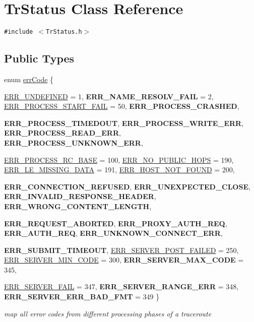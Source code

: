 \hypertarget{classTrStatus}{
\section{TrStatus Class Reference}
\label{classTrStatus}
}
{\tt \#include $<$TrStatus.h$>$}

\subsection*{Public Types}
\begin{CompactItemize}
\item 
enum \hyperlink{classTrStatus_366057e7e0cc467a592518e5f0da5302}{errCode} \{ \par
\hyperlink{classTrStatus_366057e7e0cc467a592518e5f0da5302c3415fb00f1515e6cfcc42d0774f5eb1}{ERR\_\-UNDEFINED} =  1, 
\textbf{ERR\_\-NAME\_\-RESOLV\_\-FAIL} =  2, 
\hyperlink{classTrStatus_366057e7e0cc467a592518e5f0da5302791e538219fe70804d43a86e51cf73c0}{ERR\_\-PROCESS\_\-START\_\-FAIL} =  50, 
\textbf{ERR\_\-PROCESS\_\-CRASHED}, 
\par
\textbf{ERR\_\-PROCESS\_\-TIMEDOUT}, 
\textbf{ERR\_\-PROCESS\_\-WRITE\_\-ERR}, 
\textbf{ERR\_\-PROCESS\_\-READ\_\-ERR}, 
\textbf{ERR\_\-PROCESS\_\-UNKNOWN\_\-ERR}, 
\par
\hyperlink{classTrStatus_366057e7e0cc467a592518e5f0da5302942bd0dd29fcfa7e4566a28bbf969393}{ERR\_\-PROCESS\_\-RC\_\-BASE} =  100, 
\hyperlink{classTrStatus_366057e7e0cc467a592518e5f0da5302257b1efa4186c926bd152bbee68c2c4f}{ERR\_\-NO\_\-PUBLIC\_\-HOPS} =  190, 
\hyperlink{classTrStatus_366057e7e0cc467a592518e5f0da53028c1c3321a69ca2c1b6dcf5be3b0e1a79}{ERR\_\-LE\_\-MISSING\_\-DATA} =  191, 
\hyperlink{classTrStatus_366057e7e0cc467a592518e5f0da53026be2333c602f24072eec6688160f5e32}{ERR\_\-HOST\_\-NOT\_\-FOUND} =  200, 
\par
\textbf{ERR\_\-CONNECTION\_\-REFUSED}, 
\textbf{ERR\_\-UNEXPECTED\_\-CLOSE}, 
\textbf{ERR\_\-INVALID\_\-RESPONSE\_\-HEADER}, 
\textbf{ERR\_\-WRONG\_\-CONTENT\_\-LENGTH}, 
\par
\textbf{ERR\_\-REQUEST\_\-ABORTED}, 
\textbf{ERR\_\-PROXY\_\-AUTH\_\-REQ}, 
\textbf{ERR\_\-AUTH\_\-REQ}, 
\textbf{ERR\_\-UNKNOWN\_\-CONNECT\_\-ERR}, 
\par
\textbf{ERR\_\-SUBMIT\_\-TIMEOUT}, 
\hyperlink{classTrStatus_366057e7e0cc467a592518e5f0da5302d82874b4be3ee405df340a92f763161e}{ERR\_\-SERVER\_\-POST\_\-FAILED} =  250, 
\hyperlink{classTrStatus_366057e7e0cc467a592518e5f0da5302d9e3f200861eaf809811bde85ee56520}{ERR\_\-SERVER\_\-MIN\_\-CODE} =  300, 
\textbf{ERR\_\-SERVER\_\-MAX\_\-CODE} =  345, 
\par
\hyperlink{classTrStatus_366057e7e0cc467a592518e5f0da53025d0359a8465346dafc834a6a048508cc}{ERR\_\-SERVER\_\-FAIL} =  347, 
\textbf{ERR\_\-SERVER\_\-RANGE\_\-ERR} =  348, 
\textbf{ERR\_\-SERVER\_\-ERR\_\-BAD\_\-FMT} =  349
 \}
\begin{CompactList}\small\item\em map all error codes from different processing phases of a traceroute \item\end{CompactList}\end{CompactItemize}
